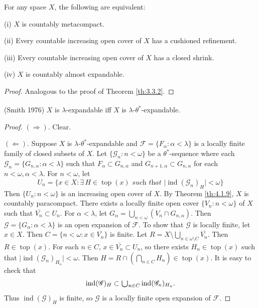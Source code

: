 \documentclass[ch3.tex]{subfiles}
\begin{document}
{\theorem{\label{th:3.3.3}}
For any space $X$, the following are equivalent:

\textup{(i)}  $X$ is countably metacompact.

\textup{(ii)}  Every countable increasing open cover of $X$ has a cushioned refinement.

\textup{(iii)}  Every countable increasing open cover of $X$ has a closed shrink.

\textup{(iv)} $X$ is countably almost expandable.
}

\begin{proof}
Analogous to the proof of Theorem \ref{th:3.3.2}.
\end{proof}

{\theorem{\label{th:3.3.4}} 
\textup{(\hstretch{1.8}{[}Smith 1976\hstretch{1.8}{]}\textsuperscript{\cite{Smith1976}})}
$X$ is $\lambda$-expandable iff $X$ is 
$\lambda$-$\theta^*$-expandable.
}

\begin{proof} $(\Rightarrow)$. Clear.

$(\Leftarrow).$ 
Suppose $X$ is $\lambda$-$\theta^*$-expandable and 
$\mathscr{F} = \{F_\alpha:  \alpha < \lambda\}$ is a locally finite family of 
closed subsets of $X$. Let $\{\mathscr{G}_n: n < \omega\}$ be a 
$\theta^*$-sequence where each 
$\mathscr{G}_n = \{G_{n,\alpha}: \alpha < \lambda\}$ such that 
$F_\alpha \subset G_{n,\alpha}$ and $G_{n+1,\alpha} \subset G_{n,\alpha}$ 
for each $n<\omega, \alpha<\lambda$.
For $n < \omega$, let
$$U_n = \{x \in X: \exists \, H \in \operatorname{top}(x) \textit{ such that } \vert{}\operatorname{ind}(\mathscr{G}_n)_H\vert{} < \omega\}$$
\noindent Then $\{U_n: n < \omega\}$ is an increasing open cover of $X$. 
By Theorem \ref{th:4.1.9}, $X$ is countably paracompact. 
There exists a locally finite open cover $\{V_n: n < \omega\}$ of $X$ 
such that $\overline{V_n} \subset U_n$. 
For $\alpha < \lambda$, let $G_\alpha = \bigcup_{n < \omega} (V_n \cap G_{n,\alpha})$.
Then $\mathscr{G} = \{G_\alpha: \alpha < \lambda\}$ is an open expansion of $\mathscr{F}$. To show that $\mathscr{G}$ is locally finite, let $x \in X$.
Then $C = \{n < \omega: x \in \overline{V_n}\}$ is finite. 
Let $R = X \setminus \bigcup_{n \in\omega\setminus C} \overline{V_n}$. 
Then $R \in \operatorname{top}(x)$. For each $n \in C$, 
$x\in\overline{V_n} \subset U_n$, so there exists $H_n \in \operatorname{top}(x)$ 
such that $\vert{}\operatorname{ind}(\mathscr{G}_n)_{H_n}\vert{} < \omega$. Then
$H = R \cap(\bigcap_{n \in C} H_n )\in \operatorname{top}(x)$.
It is easy to check that 
$$\operatorname{ind}(\mathscr{G})_H \subset \raisebox{-2pt}{\scalebox{1.5}{$\cup$}}_{n \in C} \operatorname{ind}(\mathscr{G}_n)_{H_n}.$$ 
\noindent Thus $\operatorname{ind}(\mathscr{G})_H$ is finite, 
so $\mathscr{G}$ is a locally finite open expansion of $\mathscr{F}$.
\end{proof}
\end{document}
